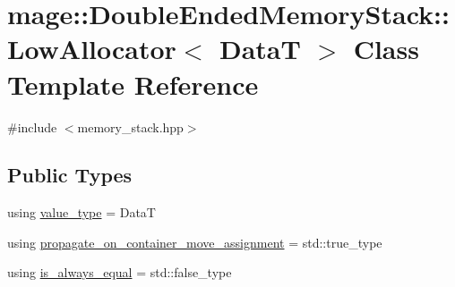 \hypertarget{classmage_1_1_double_ended_memory_stack_1_1_low_allocator}{}\section{mage\+:\+:Double\+Ended\+Memory\+Stack\+:\+:Low\+Allocator$<$ DataT $>$ Class Template Reference}
\label{classmage_1_1_double_ended_memory_stack_1_1_low_allocator}


{\ttfamily \#include $<$memory\+\_\+stack.\+hpp$>$}

\subsection*{Public Types}
\begin{DoxyCompactItemize}
\item 
using \hyperlink{classmage_1_1_double_ended_memory_stack_1_1_low_allocator_a76b57f9b67a84b4e09def8ce54451acb}{value\+\_\+type} = DataT
\item 
using \hyperlink{classmage_1_1_double_ended_memory_stack_1_1_low_allocator_aa74eb72275d390ec7b1169602b338c5d}{propagate\+\_\+on\+\_\+container\+\_\+move\+\_\+assignment} = std\+::true\+\_\+type
\item 
using \hyperlink{classmage_1_1_double_ended_memory_stack_1_1_low_allocator_a376248a384b398529bd888e18778e777}{is\+\_\+always\+\_\+equal} = std\+::false\+\_\+type
\end{DoxyCompactItemize}
